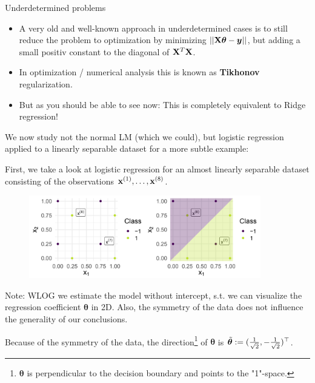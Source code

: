 \begin{vbframe} {Underdetermined problems}
\framebreak
  \begin{itemize}
   \item A very old and well-known approach in underdetermined cases is to still reduce the problem to optimization by minimizing $|| \mathbf{X} \bm{\theta} - \bm{y}||$, but adding a small positiv constant to the diagonal of $\mathbf{X}^T \mathbf{X}$.
   \item In optimization / numerical analysis this is known as \textbf{Tikhonov} regularization.
   \item But as you should be able to see now: This is completely equivalent to Ridge regression!
  \end{itemize}

\framebreak
\begin{footnotesize}
We now study not the normal LM (which we could), but logistic regression applied to a linearly separable dataset for a more subtle example:

\medskip
First, we take a look at logistic regression for an almost linearly separable dataset consisting of the observations $\mathbf{x}^{(1)}, \dots, \mathbf{x}^{(8)}$.
\vfill

\begin{figure}
\includegraphics[width=0.9\textwidth]{figure_man/undet-problem01.png}\\
\end{figure}


Note: WLOG we estimate the
model without intercept, s.t. we can visualize the regression coefficient
$\bm{\theta}$ in 2D. Also, the symmetry of the data does not influence the generality of our conclusions.
\end{footnotesize}

\framebreak
\begin{footnotesize}
Because of the symmetry of the data, the direction\footnote[frame]{$\bm{\theta}$ is perpendicular to the decision boundary and points to the "1"-space.} of $\bm{\theta}$ is $\tilde{\bm{\theta}} := (\frac{1}{\sqrt{2}}, -\frac{1}{\sqrt{2}})^\top$.

\medskip


\end{footnotesize}
\end{vbframe}
